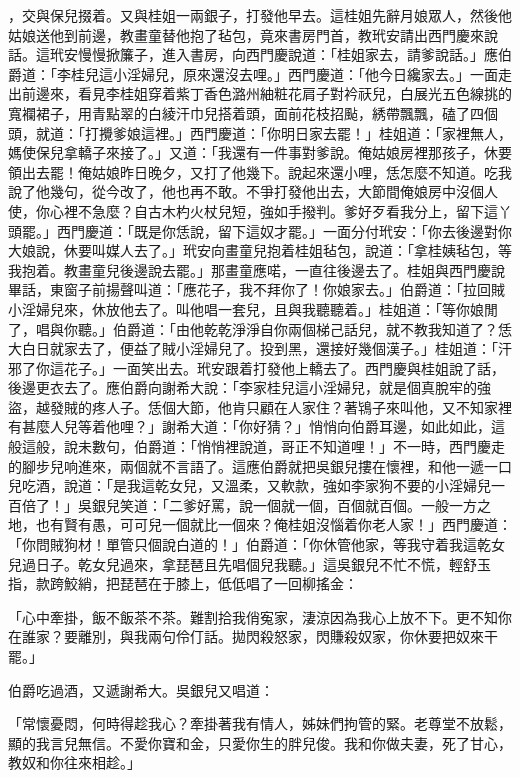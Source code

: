 \begin{showcontents}{}
，交與保兒掇着。又與桂姐一兩銀子，打發他早去。這桂姐先辭月娘眾人，然後他姑娘送他到前邊，教畫童替他抱了毡包，竟來書房門首，教玳安請出西門慶來說話。這玳安慢慢掀簾子，進入書房，向西門慶說道：「桂姐家去，請爹說話。」應伯爵道：「李桂兒這小淫婦兒，原來還沒去哩。」西門慶道：「他今日纔家去。」一面走出前邊來，看見李桂姐穿着紫丁香色潞州紬粧花肩子對衿祆兒，白展光五色線挑的寬襴裙子，用青點翠的白綾汗巾兒搭着頭，面前花枝招颭，綉帶飄飄，磕了四個頭，就道：「打攪爹娘這裡。」西門慶道：「你明日家去罷！」桂姐道：「家裡無人，媽使保兒拿轎子來接了。」又道：「我還有一件事對爹說。俺姑娘房裡那孩子，休要領出去罷！俺姑娘昨日晚夕，又打了他幾下。說起來還小哩，恁怎麼不知道。吃我說了他幾句，從今改了，他也再不敢。不爭打發他出去，大節間俺娘房中沒個人使，你心裡不急麼？自古木杓火杖兒短，強如手撥判。爹好歹看我分上，留下這丫頭罷。」西門慶道：「既是你恁說，留下這奴才罷。」一面分付玳安：「你去後邊對你大娘說，休要叫媒人去了。」玳安向畫童兒抱着桂姐毡包，說道：「拿桂姨毡包，等我抱着。教畫童兒後邊說去罷。」那畫童應喏，一直往後邊去了。桂姐與西門慶說畢話，東窗子前揚聲叫道：「應花子，我不拜你了！你娘家去。」伯爵道：「拉回賊小淫婦兒來，休放他去了。叫他唱一套兒，且與我聽聽着。」桂姐道：「等你娘閒了，唱與你聽。」伯爵道：「由他乾乾淨淨自你兩個梯己話兒，就不教我知道了？恁大白日就家去了，便益了賊小淫婦兒了。投到黑，還接好幾個漢子。」桂姐道：「汗邪了你這花子。」一面笑出去。玳安跟着打發他上轎去了。西門慶與桂姐說了話，後邊更衣去了。應伯爵向謝希大說：「李家桂兒這小淫婦兒，就是個真脫牢的強盜，越發賊的疼人子。恁個大節，他肯只顧在人家住？著鴇子來叫他，又不知家裡有甚麼人兒等着他哩？」謝希大道：「你好猜？」悄悄向伯爵耳邊，如此如此，這般這般，說未數句，伯爵道：「悄悄裡說道，哥正不知道哩！」不一時，西門慶走的腳步兒响進來，兩個就不言語了。這應伯爵就把吳銀兒摟在懷裡，和他一遞一口兒吃酒，說道：「是我這乾女兒，又溫柔，又軟款，強如李家狗不要的小淫婦兒一百倍了！」吳銀兒笑道：「二爹好罵，說一個就一個，百個就百個。一般一方之地，也有賢有愚，可可兒一個就比一個來？俺桂姐沒惱着你老人家！」西門慶道：「你問賊狗材！單管只個說白道的！」伯爵道：「你休管他家，等我守着我這乾女兒過日子。乾女兒過來，拿琵琶且先唱個兒我聽。」這吳銀兒不忙不慌，輕舒玉指，款跨鮫綃，把琵琶在于膝上，低低唱了一回柳搖金：

「心中牽掛，飯不飯茶不茶。難割拾我俏寃家，淒涼因為我心上放不下。更不知你在誰家？要離別，與我兩句伶仃話。拋閃殺怒家，閃賺殺奴家，你休要把奴來干罷。」

伯爵吃過酒，又遞謝希大。吳銀兒又唱道：

「常懷憂悶，何時得趁我心？牽掛著我有情人，姊妹們拘管的緊。老尊堂不放鬆，顯的我言兒無信。不愛你寶和金，只愛你生的胖兒俊。我和你做夫妻，死了甘心，教奴和你往來相趁。」


\end{showcontents}
